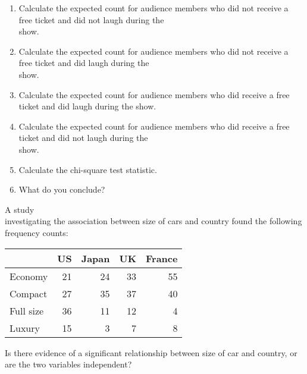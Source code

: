 \documentclass[11pt]{book}\usepackage[]{graphicx}\usepackage[]{color}
\begin{document}
\begin{exercises}
\begin{exercise}
\begin{enumerate}
  \item Calculate the expected count for audience members who did not receive a \\ free ticket and did not laugh during the \\ show.
  \item Calculate the expected count for audience members who did not receive a \\ free ticket and did laugh during the \\ show.
  \item Calculate the expected count for audience members who did receive a free \\ ticket and did laugh during the show.
  \item Calculate the expected count for audience members who did receive a free \\ ticket and did not laugh during the \\ show.
  \item Calculate the chi-square test statistic.
  \item What do you conclude?
\end{enumerate}

\end{exercise}
\begin{solution}  %

\end{solution}

\begin{exercise} %

A study \\ investigating the association between size of cars and country found the following \\ frequency counts:

\begin{table}[ht]
\centering 
\begin{tabular}{@{} lrrrr @{}} \hline
         & US & Japan & UK & France \\ \hline
Economy & 21 & 24 & 33 & 55 \\
Compact & 27 & 35 & 37 & 40 \\
Full size & 36 & 11 & 12 & 4 \\
Luxury  & 15 & 3 & 7 & 8 \\ \hline
\end{tabular}
\end{table}

Is there evidence of a significant relationship between size of car and country, or are the two variables independent?
\end{exercise}
\begin{solution} %


\end{solution}
\end{exercises}
\end{document}
